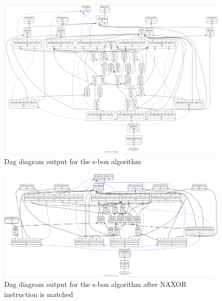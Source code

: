\begin{figure}
    \centering
    \includegraphics[scale=0.35]{adding_new_instr/naxor_dag_diagram.png}
    \caption{Dag diagram output for the s-box algorithm}
    \label{fig:naxor_dag_diagram}
\end{figure}

\begin{minipage}{\linewidth}

\end{minipage}

\begin{minipage}{\linewidth}

\end{minipage}

\begin{figure}
    \centering
    \includegraphics[scale=0.19]{adding_new_instr/naxor_match.png}
    \caption{Dag diagram output for the s-box algorithm after NAXOR instruction is matched}
    \label{fig:naxor_match_diagram}
\end{figure}

